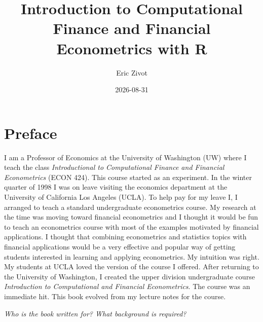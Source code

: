 \documentclass[
  letterpaper,
  DIV=11,
  numbers=noendperiod]{scrreprt}
\title{Introduction to Computational Finance and Financial Econometrics
with R}
\author{Eric Zivot}
\date{2026-08-31}
\renewcommand*\contentsname{Table of contents}
\newcommand\contentsname{Table of contents}
\theoremstyle{definition}
\theoremstyle{definition}
\theoremstyle{remark}
\begin{document}
\maketitle
\ifdefined\Shaded\renewenvironment{Shaded}{\begin{tcolorbox}[breakable, boxrule=0pt, enhanced, interior hidden, borderline west={3pt}{0pt}{shadecolor}, frame hidden, sharp corners]}{\end{tcolorbox}}\fi

\renewcommand*\contentsname{Table of contents}
{
\hypersetup{linkcolor=}
\setcounter{tocdepth}{2}
\tableofcontents
}

\hypertarget{preface}{%
\chapter*{Preface}\label{preface}}


I am a Professor of Economics at the University of Washington (UW) where
I teach the class \emph{Introductional to Computational Finance and
Financial Econometrics} (ECON 424). This course started as an
experiment. In the winter quarter of 1998 I was on leave visiting the
economics department at the University of California Los Angeles (UCLA).
To help pay for my leave I, I arranged to teach a standard undergraduate
econometrics course. My research at the time was moving toward financial
econometrics and I thought it would be fun to teach an econometrics
course with most of the examples motivated by financial applications. I
thought that combining econometrics and statistics topics with financial
applications would be a very effective and popular way of getting
students interested in learning and applying econometrics. My intuition
was right. My students at UCLA loved the version of the course I
offered. After returning to the University of Washington, I created the
upper division undergraduate course \emph{Introduction to Computational
and Financial Econometrics}. The course was an immediate hit. This book
evolved from my lecture notes for the course.

\emph{Who is the book written for? What background is required?}
\end{document}
